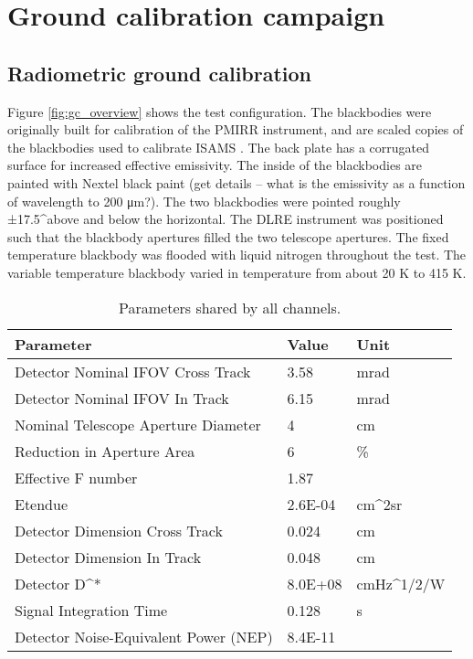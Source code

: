 \section{Ground calibration campaign}

\subsection{Radiometric ground calibration}
Figure \ref{fig:gc_overview} shows the test configuration.  The blackbodies were originally built for calibration of the PMIRR instrument, and are scaled copies of the blackbodies used to calibrate ISAMS \cite{Nightingale_1991}. The back plate has a corrugated surface for increased effective emissivity. The inside of the blackbodies are painted with Nextel black paint (get details – what is the emissivity as a function of wavelength to 200 μm?). The two blackbodies were pointed roughly ±17.5^\circ above and below the horizontal.  The DLRE instrument was positioned such that the blackbody apertures filled the two telescope apertures.  The fixed temperature blackbody was flooded with liquid nitrogen throughout the test.  The variable temperature blackbody varied in temperature from about 20 K to 415 K.
\begin{table}
\begin{tabular}{lll}
Parameter & Value & Unit\\
\hline
Detector Nominal IFOV Cross Track & 3.58 & mrad \\
Detector Nominal IFOV In Track & 6.15 & mrad \\
Nominal Telescope Aperture Diameter & 4 & cm\\
Reduction in Aperture Area & 6 & \% \\
Effective F number & 1.87 & \\
Etendue & 2.6E-04 & cm^{2}sr \\
Detector Dimension Cross Track & 0.024 & cm \\
Detector Dimension In Track & 0.048 & cm \\
Detector D^* & 8.0E+08 & cmHz^{1/2}/W \\
Signal Integration Time & 0.128 & s \\
Detector Noise-Equivalent Power (NEP) & 8.4E-11 & \\
\hline
\end{tabular}
\caption{\label{tab:parameters_shared} Parameters shared by all channels.}
\end{table}

